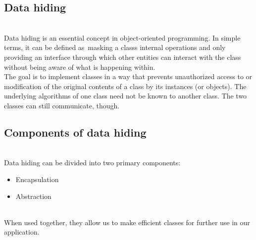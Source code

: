 

\subsection{Data hiding}\label{1N8Jf6NQE3wOoBVqfcj8j}
\\
Data hiding is an essential concept in object-oriented programming. In simple terms, it can be defined as~masking a class\textquotesingle s internal operations and only providing an interface through which other entities can interact with the class without being aware of what is happening within.
\\
The goal is to implement classes in a way that prevents unauthorized access to or modification of the original contents of a class by its instances (or objects). The underlying algorithms of one class need not be known to another class. The two classes can still communicate, though.

\subsection{Components of data hiding}\label{YfvOALpEP6uI3sSQGd8RQ}
\\
Data hiding can be divided into two primary components:

\begin{itemize}
\item
\protect{}\label{pxPnVdVg_FmeIGOZMZcXt}
Encapsulation
\item
\protect{}\label{N3VVEYv3J9V4fStygPkqM}
Abstraction
\end{itemize}
\\
When used together, they allow us to make efficient classes for further use in our application.

